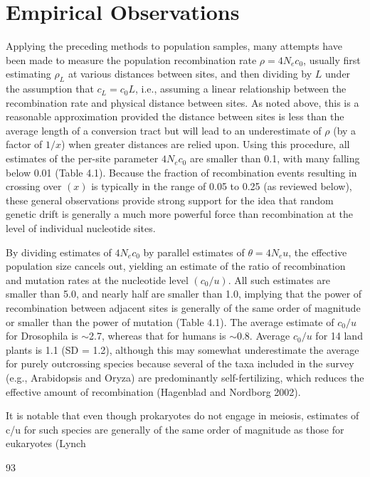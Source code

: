 \documentclass{article}
\begin{document}
\section{Empirical Observations}
Applying the preceding methods to population samples, many attempts have been made to measure the population recombination rate  $ \rho = 4N_{e}c_{0} $, usually first estimating  $ \rho_{L} $ at various distances between sites, and then dividing by  $ L $ under the assumption that  $ c_{L} = c_{0}L $, i.e., assuming a linear relationship between the recombination rate and physical distance between sites. As noted above, this is a reasonable approximation provided the distance between sites is less than the average length of a conversion tract but will lead to an underestimate of  $ \rho $ (by a factor of  $ 1/x $) when greater distances are relied upon. Using this procedure, all estimates of the per-site parameter  $ 4N_{e}c_{0} $ are smaller than 0.1, with many falling below 0.01 (Table 4.1). Because the fraction of recombination events resulting in crossing over  $ (x) $ is typically in the range of 0.05 to 0.25 (as reviewed below), these general observations provide strong support for the idea that random genetic drift is generally a much more powerful force than recombination at the level of individual nucleotide sites.

By dividing estimates of  $ 4N_{e}c_{0} $ by parallel estimates of  $ \theta = 4N_{e}u $, the effective population size cancels out, yielding an estimate of the ratio of recombination and mutation rates at the nucleotide level  $ (c_{0}/u) $. All such estimates are smaller than 5.0, and nearly half are smaller than 1.0, implying that the power of recombination between adjacent sites is generally of the same order of magnitude or smaller than the power of mutation (Table 4.1). The average estimate of  $ c_{0}/u $ for Drosophila is  $ \sim $2.7, whereas that for humans is  $ \sim $0.8. Average  $ c_{0}/u $ for 14 land plants is 1.1 (SD = 1.2), although this may somewhat underestimate the average for purely outcrossing species because several of the taxa included in the survey (e.g., Arabidopsis and Oryza) are predominantly self-fertilizing, which reduces the effective amount of recombination (Hagenblad and Nordborg 2002).

It is notable that even though prokaryotes do not engage in meiosis, estimates of c/u for such species are generally of the same order of magnitude as those for eukaryotes (Lynch

93
\end{document}
